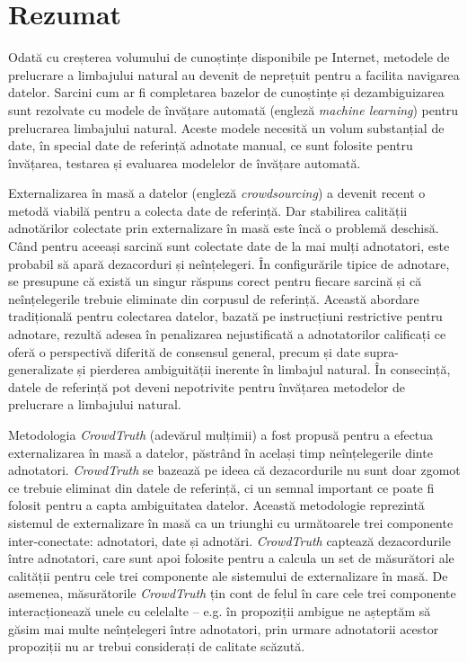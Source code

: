 \manualmark
{}

\chapter*{Rezumat}

Odată cu creșterea volumului de cunoștințe disponibile pe Internet, metodele de prelucrare a limbajului natural au devenit de neprețuit pentru a facilita navigarea datelor. Sarcini cum ar fi completarea bazelor de cunoștințe și dezambiguizarea sunt rezolvate cu modele de învățare automată (engleză \textit{machine learning}) pentru prelucrarea limbajului natural. Aceste modele necesită un volum substanțial de date, în special date de referință adnotate manual, ce sunt folosite pentru învățarea, testarea și evaluarea modelelor de învățare automată.

Externalizarea în masă a datelor (engleză \textit{crowdsourcing}) a devenit recent o metodă viabilă pentru a colecta date de referință. Dar stabilirea calității adnotărilor colectate prin externalizare în masă este încă o problemă deschisă. Când pentru aceeași sarcină sunt colectate date de la mai mulți adnotatori, este probabil să apară dezacorduri și neînțelegeri. În configurările tipice de adnotare, se presupune că există un singur răspuns corect pentru fiecare sarcină și că neînțelegerile trebuie eliminate din corpusul de referință. Această abordare tradițională pentru colectarea datelor, bazată pe instrucțiuni restrictive pentru adnotare, rezultă adesea în penalizarea nejustificată a adnotatorilor calificați ce oferă o perspectivă diferită de consensul general, precum și date supra-generalizate și pierderea ambiguității inerente în limbajul natural. În consecință, datele de referință pot deveni nepotrivite pentru învățarea metodelor de prelucrare a limbajului natural.

Metodologia \textit{CrowdTruth} (adevărul mulțimii) a fost propusă pentru a efectua externalizarea în masă a datelor, păstrând în același timp neînțelegerile dinte adnotatori. \textit{CrowdTruth} se bazează pe ideea că dezacordurile nu sunt doar zgomot ce trebuie eliminat din datele de referință, ci un semnal important ce poate fi folosit pentru a capta ambiguitatea datelor. Această metodologie reprezintă sistemul de externalizare în masă ca un triunghi cu următoarele trei componente inter-conectate: adnotatori, date și adnotări. \textit{CrowdTruth} captează dezacordurile între adnotatori, care sunt apoi folosite pentru a calcula un set de măsurători ale calității pentru cele trei componente ale sistemului de externalizare în masă. De asemenea, măsurătorile \textit{CrowdTruth} țin cont de felul în care cele trei componente interacționează unele cu celelalte -- e.g. în propoziții ambigue ne așteptăm să găsim mai multe neînțelegeri între adnotatori, prin urmare adnotatorii acestor propoziții nu ar trebui considerați de calitate scăzută.

